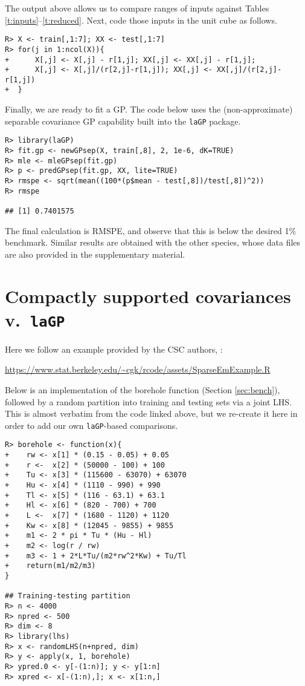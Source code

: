 \documentclass[12pt]{article}
\begin{document}
\noindent The output above allows us to compare ranges of inputs against
Tables \ref{t:inputs}--\ref{t:reduced}.  Next,  code those inputs in the unit 
cube as follows.  

{\singlespacing 
\begin{verbatim}
R> X <- train[,1:7]; XX <- test[,1:7]
R> for(j in 1:ncol(X)){
+      X[,j] <- X[,j] - r[1,j]; XX[,j] <- XX[,j] - r[1,j]; 
+      X[,j] <- X[,j]/(r[2,j]-r[1,j]); XX[,j] <- XX[,j]/(r[2,j]-r[1,j])
+  }
\end{verbatim}} 

Finally, we are ready to fit a GP.  The code below uses the (non-approximate)
separable covariance GP capability built into the {\tt laGP} package.

{\singlespacing
\begin{verbatim}
R> library(laGP)
R> fit.gp <- newGPsep(X, train[,8], 2, 1e-6, dK=TRUE)
R> mle <- mleGPsep(fit.gp)
R> p <- predGPsep(fit.gp, XX, lite=TRUE)
R> rmspe <- sqrt(mean((100*(p$mean - test[,8])/test[,8])^2))
R> rmspe

## [1] 0.7401575
\end{verbatim}}

\noindent The final calculation is RMSPE, and observe that this is below the 
desired 1\% benchmark.  Similar results are obtained with the other species, 
whose data files are also provided in the supplementary material.

\section{Compactly supported covariances v.~{\tt laGP}}
\label{sec:csc}

Here we follow an example provided by the CSC authors, \citet{kaufman:etal:2012}: 

\begin{center}
\url{https://www.stat.berkeley.edu/~cgk/rcode/assets/SparseEmExample.R}
\end{center}

\noindent Below is an implementation of the borehole function (Section
\ref{sec:bench}), followed by a random partition into training and testing
sets via a joint LHS.  This is almost verbatim from the code linked above, but 
we re-create it here in order to add our own {\tt laGP}-based comparisons.

{\singlespacing
\begin{verbatim}
R> borehole <- function(x){
+    rw <- x[1] * (0.15 - 0.05) + 0.05
+    r <-  x[2] * (50000 - 100) + 100
+    Tu <- x[3] * (115600 - 63070) + 63070
+    Hu <- x[4] * (1110 - 990) + 990
+    Tl <- x[5] * (116 - 63.1) + 63.1
+    Hl <- x[6] * (820 - 700) + 700
+    L <-  x[7] * (1680 - 1120) + 1120
+    Kw <- x[8] * (12045 - 9855) + 9855
+    m1 <- 2 * pi * Tu * (Hu - Hl)
+    m2 <- log(r / rw)
+    m3 <- 1 + 2*L*Tu/(m2*rw^2*Kw) + Tu/Tl
+    return(m1/m2/m3)
}

## Training-testing partition
R> n <- 4000
R> npred <- 500
R> dim <- 8
R> library(lhs)
R> x <- randomLHS(n+npred, dim)
R> y <- apply(x, 1, borehole)
R> ypred.0 <- y[-(1:n)]; y <- y[1:n]
R> xpred <- x[-(1:n),]; x <- x[1:n,]
\end{verbatim}}
\end{document}
